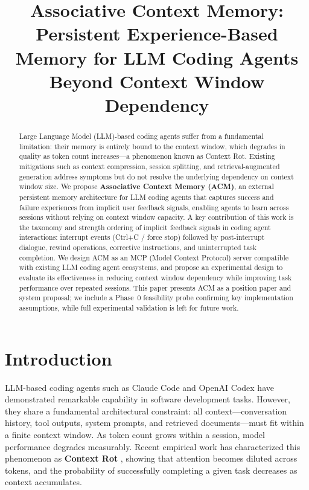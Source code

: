 \documentclass[conference]{IEEEtran}
\begin{document}
\title{Associative Context Memory: Persistent Experience-Based Memory for LLM Coding Agents Beyond Context Window Dependency}

\author{
}

\maketitle

\begin{abstract}
Large Language Model (LLM)-based coding agents suffer from a fundamental limitation: their memory is entirely bound to the context window, which degrades in quality as token count increases---a phenomenon known as Context Rot. Existing mitigations such as context compression, session splitting, and retrieval-augmented generation address symptoms but do not resolve the underlying dependency on context window size. We propose \textbf{Associative Context Memory (ACM)}, an external persistent memory architecture for LLM coding agents that captures success and failure experiences from implicit user feedback signals, enabling agents to learn across sessions without relying on context window capacity. A key contribution of this work is the taxonomy and strength ordering of implicit feedback signals in coding agent interactions: interrupt events (Ctrl+C / force stop) followed by post-interrupt dialogue, rewind operations, corrective instructions, and uninterrupted task completion. We design ACM as an MCP (Model Context Protocol) server compatible with existing LLM coding agent ecosystems, and propose an experimental design to evaluate its effectiveness in reducing context window dependency while improving task performance over repeated sessions. This paper presents ACM as a position paper and system proposal; we include a Phase~0 feasibility probe confirming key implementation assumptions, while full experimental validation is left for future work.
\end{abstract}

\section{Introduction}

LLM-based coding agents such as Claude Code and OpenAI Codex have demonstrated remarkable capability in software development tasks. However, they share a fundamental architectural constraint: all context---conversation history, tool outputs, system prompts, and retrieved documents---must fit within a finite context window. As token count grows within a session, model performance degrades measurably. Recent empirical work has characterized this phenomenon as \textbf{Context Rot} \cite{ChromaResearch2025}, showing that attention becomes diluted across tokens, and the probability of successfully completing a given task decreases as context accumulates.
\end{document}
